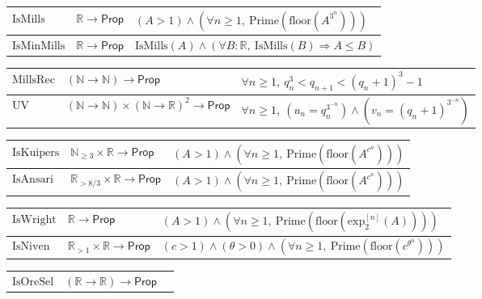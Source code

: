 \documentclass[11pt,reqno]{amsart}
\theoremstyle{blueplain}
\numberwithin{equation}{section}
\begin{document}
{\begin{tabular}{|m{4cm}|m{5cm}|m{9cm}|}
		\hline
		$\mathrm{IsMills}$ & $\mathbb{R}\to\mathsf{Prop}$ &
		$(A>1)\wedge(\forall n\geq 1,\ \mathrm{Prime}(\mathrm{floor}(A^{3^n})))$ \\ \hline
		$\mathrm{IsMinMills}$ & $\mathbb{R}\to\mathsf{Prop}$ &
		$\mathrm{IsMills}(A)\wedge(\forall B:\mathbb{R},\ \mathrm{IsMills}(B)
		\Rightarrow A\leq B)$ \\ 
	\end{tabular}
	\noindent \newline
	\noindent
	\begin{tabular}{|m{4cm}|m{5cm}|m{9cm}|}
		\hline
		$\mathrm{MillsRec}$ & $(\mathbb{N}\to\mathbb{N})\to\mathsf{Prop}$ &
		$\forall n\geq 1,\ q_n^3<q_{n+1}<(q_n+1)^3-1$ \\ \hline
		$\mathrm{UV}$ & $(\mathbb{N}\to\mathbb{N})\times(\mathbb{N}\to\mathbb{R})^2\to\mathsf{Prop}$ &
		$\forall n\geq 1,\ (u_n=q_n^{3^{-n}})\wedge(v_n=(q_n+1)^{3^{-n}})$ \\ 
	\end{tabular}%
	\noindent \newline
	\noindent
	\begin{tabular}{|m{4cm}|m{5cm}|m{9cm}|}
		\hline
		$\mathrm{IsKuipers}$ & $\mathbb{N}_{\geq 3}\times\mathbb{R}\to\mathsf{Prop}$ &
		$(A>1)\wedge(\forall n\geq 1,\ \mathrm{Prime}(\mathrm{floor}(A^{c^n})))$ \\ \hline
		$\mathrm{IsAnsari}$ & $\mathbb{R}_{>8/3}\times\mathbb{R}\to\mathsf{Prop}$ &
		$(A>1)\wedge(\forall n\geq 1,\ \mathrm{Prime}(\mathrm{floor}(A^{c^n})))$ \\ 
	\end{tabular}
	\noindent \newline
	\noindent
	\begin{tabular}{|m{4cm}|m{5cm}|m{9cm}|}
		\hline
		$\mathrm{IsWright}$ & $\mathbb{R}\to\mathsf{Prop}$ &
		$(A>1)\wedge(\forall n\geq 1,\
		\mathrm{Prime}(\mathrm{floor}(\mathrm{exp}_2^{[n]}(A))))$ \\ \hline
		$\mathrm{IsNiven}$ & $\mathbb{R}_{>1}\times\mathbb{R}\to\mathsf{Prop}$ &
		$(c>1)\wedge(\theta>0)\wedge(\forall n\geq 1,\
		\mathrm{Prime}(\mathrm{floor}(c^{\theta^n})))$ \\ 
	\end{tabular}%
	\noindent \newline
	\noindent
	\begin{tabular}{|m{4cm}|m{5cm}|m{9cm}|}
		\hline
		$\mathrm{IsOreSel}$ & $(\mathbb{R}\to\mathbb{R})\to\mathsf{Prop}$ &

\end{tabular}}
\end{document}
